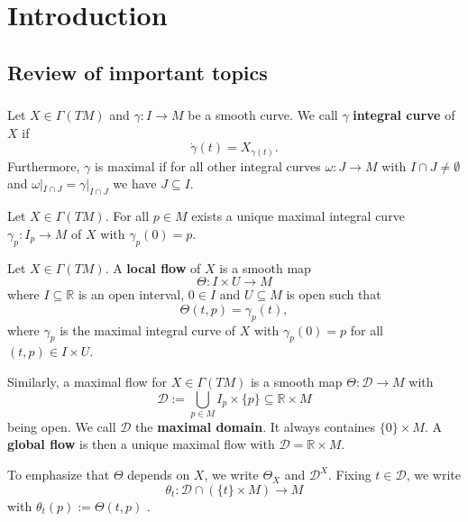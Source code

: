 \chapter{Introduction}
\setcounter{section}{-1}
\section{Review of important topics}
\subsection{}
\begin{definition}
    Let $X \in \Gamma(TM)$ and $\gamma: I \to M$ be a smooth curve. We call $\gamma$ \textbf{integral curve} of $X$ if \[
        \dot{\gamma}(t)=X_{\gamma(t)}
    .\] Furthermore, $\gamma$ is maximal if for all other integral curves $\omega: J \to M$ with $I \cap J \neq \emptyset$ and $\omega|_{I \cap J}=\gamma|_{I \cap J}$ we have $J \subseteq I$.
\end{definition}
\begin{theorem}
    Let $X \in \Gamma(TM)$. For all $p \in M$ exists a unique maximal integral curve $\gamma_p: I_p \to M$ of $X$ with $\gamma_p(0)=p$.
\end{theorem}
\begin{definition}
    Let $X \in \Gamma(TM)$. A \textbf{local flow} of $X$ is a smooth map \[
    \Theta: I \times U \to M
    \] where $I \subseteq \mathbb{R}$ is an open interval, $0 \in I$ and $U \subseteq M$ is open such that \[
    \Theta(t,p)=\gamma_p(t)
    ,\]  where $\gamma_p$ is the maximal integral curve of $X$ with $\gamma_p(0)=p$ for all $(t,p) \in I \times U$.
\end{definition}
\begin{note}
    Similarly, a maximal flow for $X \in \Gamma(TM)$ is a smooth map $\Theta: \mathcal{D} \to M$ with \[
        \mathcal{D}:=\bigcup_{p \in M} I_p \times \{p\} \subseteq \mathbb{R} \times M
    \] being open. We call $\mathcal{D}$ the \textbf{maximal domain}. It always containes $\{0\} \times M$. A \textbf{global flow} is then a unique maximal flow with $\mathcal{D}=\mathbb{R} \times M$.
\end{note}
\begin{notation}
    To emphasize that $\Theta$ depends on $X$, we write $\Theta_X$ and $\mathcal{D}^X$. Fixing $t \in \mathcal{D}$, we write \[
        \theta_t: \mathcal{D} \cap (\{t\} \times M) \to M
    \] with $\theta_t(p):=\Theta(t,p)$ .
\end{notation}
